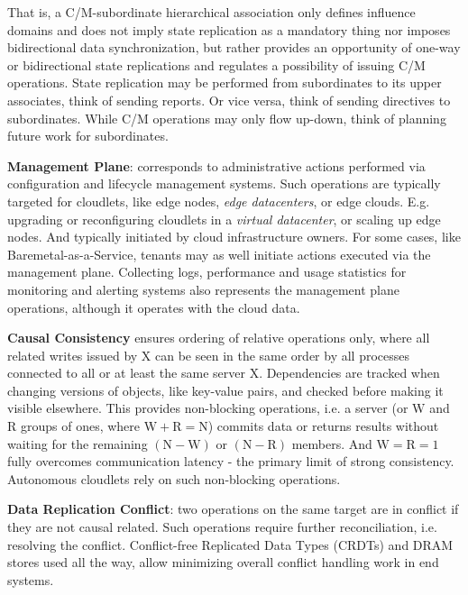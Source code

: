 \documentclass[conference]{IEEEtran}
\begin{document}
That is, a C/M-subordinate hierarchical association only defines influence
domains and does not imply state replication as a mandatory thing nor imposes
bidirectional data synchronization, but rather provides an opportunity of
one-way or bidirectional state replications and regulates a possibility of
issuing C/M operations. State replication may be performed from subordinates to
its upper associates, think of sending reports. Or vice versa, think of sending
directives to subordinates. While C/M operations may only flow up-down, think
of planning future work for subordinates.

\textbf{Management Plane}: corresponds to administrative actions performed via
configuration and lifecycle management systems. Such operations are typically
targeted for cloudlets, like edge nodes, \textit{edge datacenters}\cite{b3},
or edge clouds. E.g. upgrading or reconfiguring cloudlets in a \textit{virtual
datacenter}\cite{b3}, or scaling up edge nodes. And typically initiated by
cloud infrastructure owners. For some cases, like Baremetal-as-a-Service,
tenants may as well initiate actions executed via the management plane.
Collecting logs, performance and usage statistics for monitoring and alerting
systems also represents the management plane operations, although it operates
with the cloud data.

\textbf{Causal Consistency}\cite{b6} ensures ordering of relative operations
only, where all related writes issued by $\mathrm{X}$ can be seen in the same
order by all processes connected to all or at least the same server
$\mathrm{X}$. Dependencies are tracked when changing versions of objects, like
key-value pairs, and checked before making it visible elsewhere. This provides
non-blocking operations, i.e. a server (or $\mathrm{W}$ and $\mathrm{R}$ groups
of ones, where $\mathrm{W + R = N}$) commits data or returns results without
waiting for the remaining $\mathrm{(N - W)}$ or $\mathrm{(N - R)}$ members. And
$\mathrm{W = R = 1}$ fully overcomes communication latency - the primary limit
of strong consistency. Autonomous cloudlets rely on such non-blocking
operations.

\textbf{Data Replication Conflict}: two operations on the same target are in
conflict if they are not causal related. Such operations require further
reconciliation, i.e. resolving the conflict. Conflict-free Replicated Data
Types (CRDTs) and DRAM stores used all the way, allow minimizing overall
conflict handling work in end systems.
\end{document}
